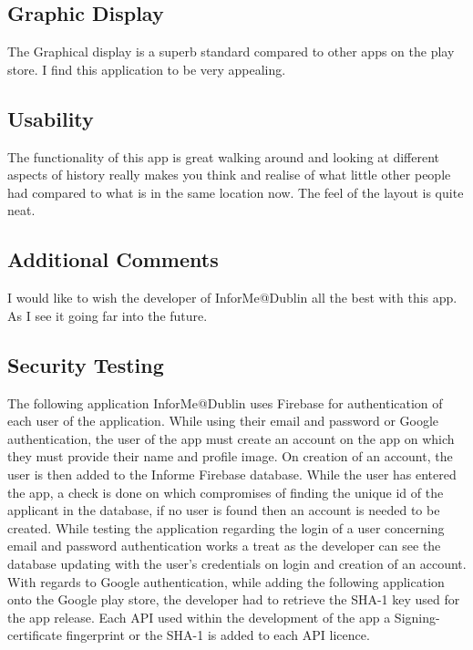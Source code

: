 \subsection{Graphic Display}
The Graphical display is a superb standard compared to other apps on the play store. I find this application to be very appealing.

\subsection{Usability}
The functionality of this app is great walking around and looking at different aspects of history really makes you think and realise of what little other people had compared to what is in the same location now. The feel of the layout is quite neat.

\subsection{Additional Comments}
I would like to wish the developer of InforMe@Dublin all the best with this app. As I see it going far into the future.

\subsection{Security Testing}
The following application InforMe@Dublin uses Firebase for authentication of each user of the application. While using their email and password or Google authentication, the user of the app must create an account on the app on which they must provide their name and profile image. On creation of an account, the user is then added to the Informe Firebase database. While the user has entered the app, a check is done on which compromises of finding the unique id of the applicant in the database, if no user is found then an account is needed to be created. While testing the application regarding the login of a user concerning email and password authentication works a treat as the developer can see the database updating with the user's credentials on login and creation of an account. With regards to Google authentication, while adding the following application onto the Google play store, the developer had to retrieve the SHA-1 key used for the app release. Each API used within the development of the app a Signing-certificate fingerprint or the SHA-1 is added to each API licence.

